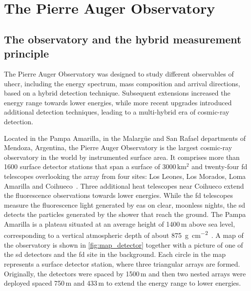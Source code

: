 \documentclass[main.tex]{subfiles}
\begin{document}
\chapter{The Pierre Auger Observatory}
\label{chapter:auger}

\section{The observatory and the hybrid measurement principle}
\label{sec:auger_hybrid_principle}

The Pierre Auger Observatory was designed to study different observables of \gls{uhecr}, including the energy spectrum, mass composition and arrival directions, based on a hybrid detection technique.
Subsequent extensions increased the energy range towards lower energies, while more recent upgrades introduced additional detection techniques, leading to a multi-hybrid era of cosmic-ray detection.

Located in the Pampa Amarilla, in the Malargüe and San Rafael departments of Mendoza, Argentina, the Pierre Auger Observatory is the largest cosmic-ray observatory in the world by instrumented surface area.
It comprises more than 1600 surface detector stations that span a surface of $3000\mathrm{\,km^2}$ and twenty-four \gls{fd} telescopes overlooking the array from four sites: Los Leones, Los Morados, Loma Amarilla and Coihueco~\cite{PierreAuger:2015:Observatory}.
Three additional \gls{heat} telescopes near Coihueco extend the fluorescence observations towards lower energies.
While the \gls{fd} telescopes measure the fluorescence light generated by \gls{eas} on clear, moonless nights, the \gls{sd} detects the particles generated by the shower that reach the ground.
The Pampa Amarilla is a plateau situated at an average height of 1400\,m above sea level, corresponding to a vertical atmospheric depth of about \SI{875}{\g\per\cm\squared}~\cite{PierreAuger:2015:Observatory}.
A map of the observatory is shown in \cref{fig:map_detector} together with a picture of one of the \gls{sd} detectors and the \gls{fd} site in the background.
Each circle in the map represents a surface detector station, where three triangular arrays are formed.
Originally, the detectors were spaced by 1500\,m and then two nested arrays were deployed spaced 750\,m and 433\,m to extend the energy range to lower energies.
\end{document}
